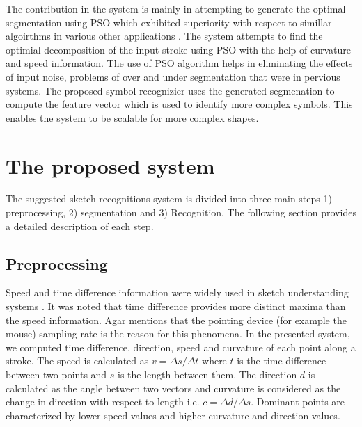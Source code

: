 \documentclass{article}
\begin{document}
The contribution in the system is mainly in attempting to generate the optimal segmentation using PSO which exhibited superiority with respect to simillar algoirthms in various other applications \cite{PolygonApproximationPSO}. The system attempts to find the optimial decomposition of the input stroke using PSO with the help of curvature and speed information. The use of PSO algorithm helps in eliminating the effects of input noise, problems of over and under segmentation that were in pervious systems. The proposed symbol recognizier uses the generated segmenation to compute the feature vector which is used to identify more complex symbols. This enables the system to be scalable for more  complex shapes. 

 
\section{The proposed system}
\label{Sysdisc}
 The suggested sketch recognitions system is divided into three main steps 1) preprocessing, 2) segmentation and 3) Recognition. The following section provides a detailed description of each step.
\subsection{Preprocessing}
\label{Prepross}
 Speed and time difference information were widely used in sketch understanding systems \cite{earlyprocess}. It was noted that time difference provides more distinct maxima than the speed information. Agar \cite{polygonfeedback31} mentions that the pointing device (for example the mouse) sampling rate is the reason for this phenomena. 
 In the presented system, we computed time difference, direction, speed and curvature of each point along a stroke. The speed is calculated as $v=\Delta s/\Delta t$ where $t$ is the time difference between two points and $s$ is the length between them. The direction $d$ is calculated as the angle between two vectors and curvature is considered as the change in direction with respect to length i.e. $c= \Delta d/\Delta s$.  Dominant points are characterized by lower speed values and higher curvature and direction values.
  
\end{document}
